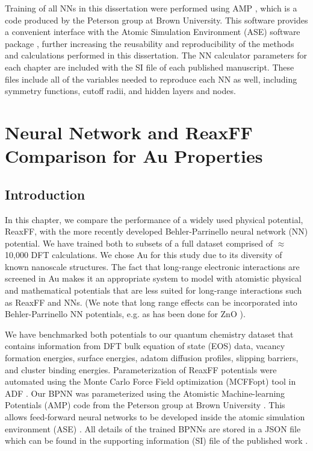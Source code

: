 \documentclass[12pt]{cmuthesis}
\begin{document}
Training of all NNs in this dissertation were performed using AMP \cite{khorshidi-2016-amp}, which is a code produced by the Peterson group at Brown University. This software provides a convenient interface with the Atomic Simulation Environment (ASE) software package \cite{bahn-2002-objec-orien}, further increasing the reusability and reproducibility of the methods and calculations performed in this dissertation. The NN calculator parameters for each chapter are included with the SI file of each published manuscript. These files include all of the variables needed to reproduce each NN as well, including symmetry functions, cutoff radii, and hidden layers and nodes.

\chapter{Neural Network and ReaxFF Comparison for Au Properties}
\label{sec:ch4}
\section{Introduction}
\label{sec:org02d70c4}
In this chapter, we compare the performance of a widely used physical potential, ReaxFF, with the more recently developed Behler-Parrinello neural network (NN) potential. We have trained both to subsets of a full dataset comprised of \(\approx\) 10,000 DFT calculations. We chose Au for this study due to its diversity of known nanoscale structures. The fact that long-range electronic interactions are screened in Au makes it an appropriate system to model with atomistic physical and mathematical potentials that are less suited for long-range interactions such as ReaxFF and NNs. (We note that long range effects can be incorporated into Behler-Parrinello NN potentials, e.g. as has been done for ZnO \cite{artrith-2011-high}).

We have benchmarked both potentials to our quantum chemistry dataset that contains information from DFT bulk equation of state (EOS) data, vacancy formation energies, surface energies, adatom diffusion profiles, slipping barriers, and cluster binding energies. Parameterization of ReaxFF potentials were automated using the Monte Carlo Force Field optimization (MCFFopt) tool in ADF \cite{velde-2001-chemis-adf,iype-2013-param-monte}. Our BPNN was parameterized using the Atomistic Machine-learning Potentials (AMP) code from the Peterson group at Brown University  \cite{khorshidi-2016-amp}. This allows feed-forward neural networks to be developed inside the atomic simulation environment (ASE) \cite{bahn-2002-objec-orien}. All details of the trained BPNNs are stored in a JSON file which can be found in the supporting information (SI) file of the published work \cite{boes-2016-neural-networ}.
\end{document}
